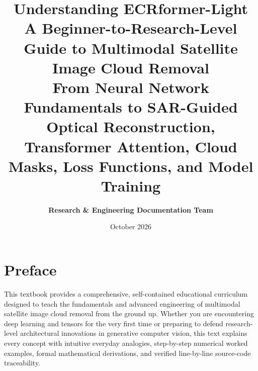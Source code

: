 \documentclass[11pt,a4paper,oneside]{book}
\title{\Huge \textbf{Understanding ECRformer-Light}\\[0.5em]
\Large \textbf{A Beginner-to-Research-Level Guide to Multimodal Satellite Image Cloud Removal}\\[1em]
\large From Neural Network Fundamentals to SAR-Guided Optical Reconstruction, Transformer Attention, Cloud Masks, Loss Functions, and Model Training}
\author{\textbf{Research \& Engineering Documentation Team}}
\date{October 2026}
\begin{document}
\frontmatter
\maketitle

\chapter*{Preface}
This textbook provides a comprehensive, self-contained educational curriculum designed to teach the fundamentals and advanced engineering of multimodal satellite image cloud removal from the ground up. Whether you are encountering deep learning and tensors for the very first time or preparing to defend research-level architectural innovations in generative computer vision, this text explains every concept with intuitive everyday analogies, step-by-step numerical worked examples, formal mathematical derivations, and verified line-by-line source-code traceability.

\tableofcontents

\mainmatter


























\backmatter




\end{document}
